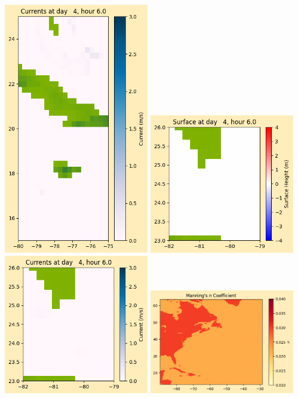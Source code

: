 \documentclass[11pt]{article}
\begin{document}
\includegraphics[width=0.475\textwidth]{frame0029fig1008.png}
\vskip 10pt 
\includegraphics[width=0.475\textwidth]{frame0029fig1009.png}
\includegraphics[width=0.475\textwidth]{frame0029fig1010.png}
\vskip 10pt 
\includegraphics[width=0.475\textwidth]{frame0029fig1011.png}
\end{document}
